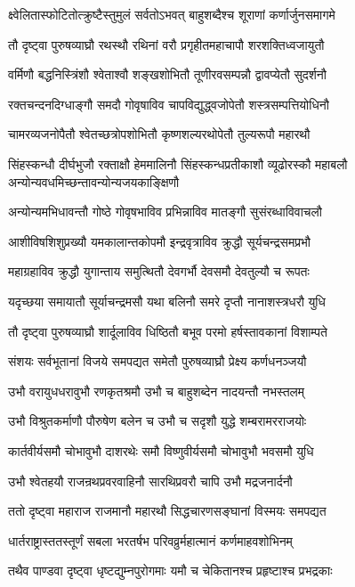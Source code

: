 \twolineshloka
{क्ष्वेलितास्फोटितोत्क्रुष्टैस्तुमुलं सर्वतोऽभवत्}
{बाहुशब्दैश्च शूराणां कर्णार्जुनसमागमे}


\twolineshloka
{तौ दृष्ट्वा पुरुषव्याघ्रौ रथस्थौ रथिनां वरौ}
{प्रगृहीतमहाचापौ शरशक्तिध्वजायुतौ}


\twolineshloka
{वर्मिणौ बद्धनिस्त्रिंशौ श्वेताश्वौ शङ्खशोभितौ}
{तूणीरवसम्पन्नौ द्वावप्येतौ सुदर्शनौ}


\twolineshloka
{रक्तचन्दनदिग्धाङ्गौ समदौ गोवृषाविव}
{चापविद्युद्ध्वजोपेतौ शस्त्रसम्पत्तियोधिनौ}


\twolineshloka
{चामरव्यजनोपैतौ श्वेतच्छत्रोपशोभितौ}
{कृष्णशल्यरथोपेतौ तुल्यरूपौ महारथौ}


\threelineshloka
{सिंहस्कन्धौ दीर्घभुजौ रक्ताक्षौ हेममालिनौ}
{सिंहस्कन्धप्रतीकाशौ व्यूढोरस्कौ महाबलौ}
{अन्योन्यवधमिच्छन्तावन्योन्यजयकाङ्क्षिणौ}


\twolineshloka
{अन्योन्यमभिधावन्तौ गोष्ठे गोवृषभाविव}
{प्रभिन्नाविव मातङ्गौ सुसंरब्धाविवाचलौ}


\twolineshloka
{आशीविषशिशुप्रख्यौ यमकालान्तकोपमौ}
{इन्द्रवृत्राविव क्रुद्धौ सूर्यचन्द्रसमप्रभौ}


\twolineshloka
{महाग्रहाविव क्रुद्धौ युगान्ताय समुत्थितौ}
{देवगर्भौ देवसमौ देवतुल्यौ च रूपतः}


\twolineshloka
{यदृच्छया समायातौ सूर्याचन्द्रमसौ यथा}
{बलिनौ समरे दृप्तौ नानाशस्त्रधरौ युधि}


\twolineshloka
{तौ दृष्ट्वा पुरुषव्याघ्रौ शार्दूलाविव धिष्ठितौ}
{बभूव परमो हर्षस्तावकानां विशाम्पते}


\twolineshloka
{संशयः सर्वभूतानां विजये समपद्यत}
{समेतौ पुरुषव्याघ्रौ प्रेक्ष्य कर्णधनञ्जयौ}


\twolineshloka
{उभौ वरायुधधरावुभौ रणकृतश्रमौ}
{उभौ च बाहुशब्देन नादयन्तौ नभस्तलम्}


\twolineshloka
{उभौ विश्रुतकर्माणौ पौरुषेण बलेन च}
{उभौ च सदृशौ युद्धे शम्बरामरराजयोः}


\twolineshloka
{कार्तवीर्यसमौ चोभावुभौ दाशरथेः समौ}
{विष्णुवीर्यसमौ चोभावुभौ भवसमौ युधि}


\twolineshloka
{उभौ श्वेतहयौ राजन्रथप्रवरवाहिनौ}
{सारथिप्रवरौ चापि उभौ मद्रजनार्दनौ}


\twolineshloka
{ततो दृष्ट्वा महाराज राजमानौ महारथौ}
{सिद्धचारणसङ्घानां विस्मयः समपद्यत}


\twolineshloka
{धार्तराष्ट्रास्ततस्तूर्णं सबला भरतर्षभ}
{परिवव्रुर्महात्मानं कर्णमाहवशोभिनम्}


\twolineshloka
{तथैव पाण्डवा दृष्ट्वा धृष्टद्युम्नपुरोगमाः}
{यमौ च चेकितानश्च प्रहृष्टाश्च प्रभद्रकाः}


